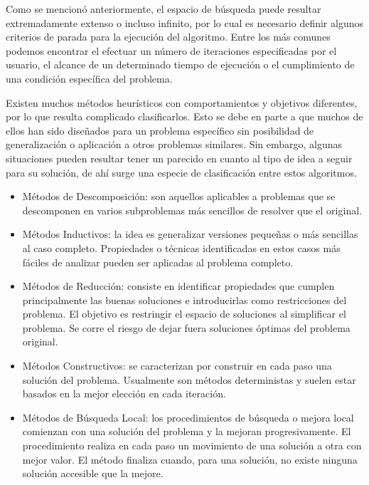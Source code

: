 \documentclass[a4paper,openright,11pt,oneside]{book}
\begin{document}
	Como se mencionó anteriormente, el espacio de búsqueda puede resultar extremadamente extenso o incluso infinito, por lo cual es necesario definir algunos criterios de parada para la ejecución del algoritmo. Entre los más comunes podemos encontrar el efectuar un número de iteraciones especificadas por el usuario, el alcance de un determinado tiempo de ejecución o el cumplimiento de una condición específica del problema.
	
	Existen muchos métodos heurísticos con comportamientos y objetivos diferentes, por lo que resulta complicado clasificarlos. Esto se debe en parte a que muchos de  ellos  han  sido  diseñados para un problema específico sin posibilidad de generalización o aplicación a otros problemas similares. Sin embargo, algunas situaciones pueden resultar tener un parecido en cuanto al tipo de idea a seguir para su solución, de ahí surge una especie de clasificación entre estos algoritmos.
	
	\begin{itemize}
		\item Métodos de Descomposición: son aquellos aplicables a problemas que se descomponen en varios subproblemas más sencillos de resolver que el original.
		
		\item Métodos Inductivos: la idea es generalizar versiones pequeñas o más sencillas al caso completo. Propiedades o técnicas identificadas en estos casos más fáciles de analizar pueden ser aplicadas al problema completo.
		
		\item Métodos de Reducción: consiste en identificar propiedades que cumplen principalmente las buenas soluciones e introducirlas como restricciones del problema.  El objetivo es restringir el espacio de soluciones al simplificar el problema. Se corre el riesgo de dejar fuera soluciones óptimas del problema original.
		
		\item Métodos Constructivos: se caracterizan por construir en cada paso una solución del problema. Usualmente son  métodos deterministas y suelen estar basados en la mejor elección en cada iteración.
		
		\item Métodos de Búsqueda Local: los  procedimientos  de  búsqueda o mejora local comienzan con una solución del problema y la mejoran progresivamente.  El procedimiento realiza en cada paso un movimiento de una solución a otra con mejor valor. El método finaliza cuando, para una solución, no existe ninguna solución accesible que la mejore.
	\end{itemize}
	
\end{document}
